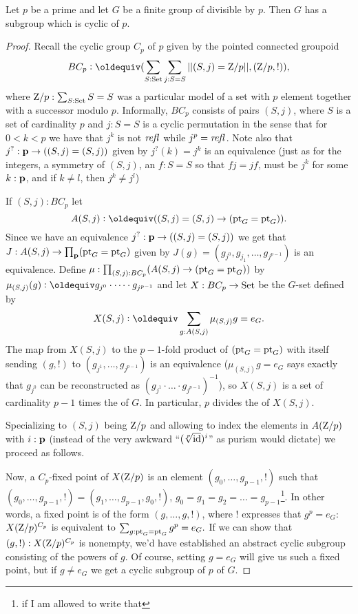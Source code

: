 \begin{theorem}
  \label{thm:cauchys}
  Let $p$ be a prime and let $G$ be a finite group of \gporder divisible by $p$.  
Then $G$ has a subgroup which is cyclic of \gporder $p$. 
\end{theorem}
\begin{proof}
Recall the cyclic group $C_p$ of \gporder $p$ given by the pointed connected groupoid
$$BC_p\defequi(\sum_{S:\Set}\sum_{j:S=S}||(S,j)=\zet/p||,(\zet/p,!)),
$$
 where $\mathrm{Z}/p:\sum_{S:\mathord{\mathrm{Set}}}S=S$ was a particular model of a set with $p$ element together with a successor modulo $p$.  Informally, $BC_p$ consists of pairs $(S,j)$, where $S$ is a set of cardinality $p$ and $j:S=S$ is a cyclic permutation in the sense that for $0<k<p$ we have that $j^k$ is not $\mathop{{\it refl}_{}}$ while $j^p=\mathop{{\it refl}_{}}$.  Note also that $j^?:\mathbf{p}\to ((S,j)=(S,j))$ given by $j^?(k)=j^k$ is an equivalence (just as for the integers, a symmetry of $(S,j)$, \ie an $f:S=S$ so that $fj=jf$, must be $j^k$ for some $k:\mathbf{p}$, and if $k\neq l$, then $j^k\neq j^l$)

If $(S,j):BC_p$ let 
$$A(S,j)\defequi ((S,j)=(S,j)\to (\pt_G=\pt_G)).$$  Since we have an equivalence $j^?:\mathbf{p}\to ((S,j)=(S,j))$ we get that $J:A(S,j)\to \prod_{\mathbf{p}}({\mathord{\mathrm{pt}}}_G={\mathord{\mathrm{pt}}}_G)$ given by $J(g)=(g_{j^0},g_{j_1},\dots,g_{j^{p-1}})$ is an equivalence.  Define $\mu:\prod_{(S,j):BC_p}(A(S,j)\to({\mathord{\mathrm{pt}}}_G={\mathord{\mathrm{pt}}}_G))$ by $\mu_{(S,j)}(g)\defequi g_{j^0}\cdot\dots\cdot g_{j^{p-1}}$ and let $X:BC_p\to\mathord{\mathrm{Set}}$ be the $G$-set defined by  
$$X(S,j)\defequi\sum_{g:A(S,j)}\mu_{(S,j)}g=e_G.$$ 
The map from $X(S,j)$ to the $p-1$-fold product of $({\mathord{\mathrm{pt}}}_G={\mathord{\mathrm{pt}}}_G)$ with itself sending $(g,!)$ to $(g_{j^1},\dots,g_{j^{p-1}})$ is an equivalence ($\mu_{(S,j)}g=e_G$ says exactly that $g_{j^0}$ can be reconstructed as $(g_{j^1}\cdot\dots\cdot g_{j^{p-1}})^{-1}$), so $X(S,j)$ is a set of cardinality $p-1$ times the \gporder of $G$.  In particular, $p$ divides the \gporder of $X(S,j)$.

Specializing to $(S,j)$ being $\mathrm{Z}/p$ and allowing to index the elements in $A(\mathrm{Z}/p)$ with $i:\mathbf{p}$ (instead of the very awkward ``$(\sqrt[p]{\mathord{\mathrm{id}}})^i$'' as purism would dictate) we proceed as follows.

Now, a $C_p$-fixed point of $X(\mathrm{Z}/p)$ is an element $(g_0,\dots,g_{p-1},!)$ such that $(g_0,\dots,g_{p-1},!)=(g_1,\dots,g_{p-1},g_0,!)$, \ie $g_0=g_1=g_2=\dots=g_{p-1}$\footnote{if I am allowed to write that}.  In other words, a fixed point is of the form $(g,\dots,g,!)$, where $!$ expresses that $g^p=e_G$:
$X(\mathrm{Z}/p)^{C_p}$ is equivalent to $\sum_{g:{\mathord{\mathrm{pt}}}_G={\mathord{\mathrm{pt}}}_G}g^p=e_G.$  If we can show that $(g,!):X(\mathrm{Z}/p)^{C_p}$ is nonempty, we'd have established an abstract cyclic subgroup consisting of the powers of $g$.  Of course, setting $g=e_G$ will give us such a fixed point, but if $g\neq e_G$ we get a cyclic subgroup of \gporder $p$ of $G$.


\end{proof}
